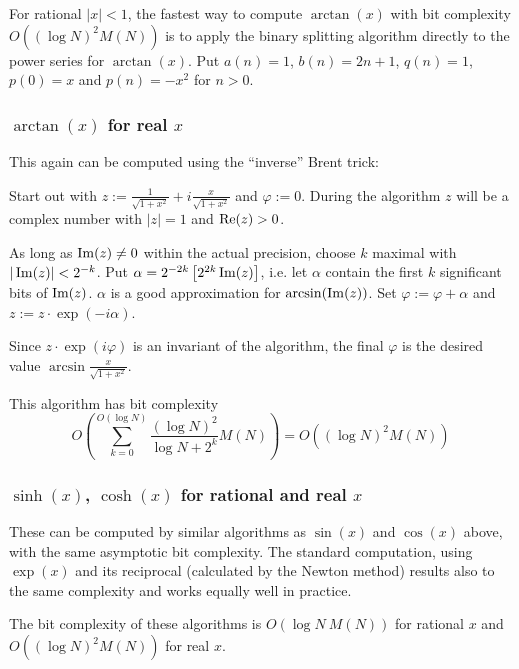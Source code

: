 For rational  \( |x|<1 \), the fastest way to compute  \( \arctan (x) \) with 
bit complexity  \( O((\log N)^{2}M(N)) \) is
to apply the binary splitting algorithm directly to the power series
for  \( \arctan (x) \). Put  \( a(n)=1 \),  \( b(n)=2n+1 \),  \( q(n)=1 \),  
\( p(0)=x \) and  \( p(n)=-x^{2} \) for  \( n>0 \).


\subsubsection{ \( \arctan (x) \) for real  \( x \)}

This again can be computed using the ``inverse'' Brent trick:

Start out with  \( z:=\frac{1}{\sqrt{1+x^{2}}}+i\frac{x}{\sqrt{1+x^{2}}} \) 
and  \( \varphi :=0 \). During the algorithm  \( z \) will be a complex number
with  \( |z|=1 \) and  \( \re (z)>0 \).

As long as  \( \im (z)\neq 0 \) within the actual precision, choose  \( k \) 
maximal with  \( |\im (z)|<2^{-k} \).
Put  \( \alpha =2^{-2k}\left[ 2^{2k}\im (z)\right]  \), i.e. let  \( \alpha  \) 
contain the first  \( k \) significant bits of  \( \im (z) \).  \( \alpha  \) 
is a good approximation for  \( \arcsin (\im (z)) \). Set  
\( \varphi :=\varphi +\alpha  \) and  \( z:=z\cdot \exp (-i\alpha ) \).

Since  \( z\cdot \exp (i\varphi ) \) is an invariant of the algorithm, the 
final  \( \varphi  \) is the desired
value  \( \arcsin \frac{x}{\sqrt{1+x^{2}}} \).

This algorithm has bit complexity
\[ O\left(\sum\limits_{k=0}^{O(\log N)} \frac{(\log N)^2}{\log N + 2^k} M(N)\right)
  = O((\log N)^{2}M(N)) \]


\subsubsection{\( \sinh (x) \), \( \cosh (x) \) for rational and real \( x \)}

These can be computed by similar algorithms as  \( \sin (x) \) and  
\( \cos (x) \) above, with the same asymptotic bit complexity. The
standard computation, using \( \exp (x) \) and its reciprocal (calculated
by the Newton method) results also to the same complexity and works equally
well in practice.

The bit complexity of these algorithms is  \( O(\log N\: M(N)) \) for rational
\( x \) and \( O((\log N)^{2}M(N)) \) for real \( x \).

